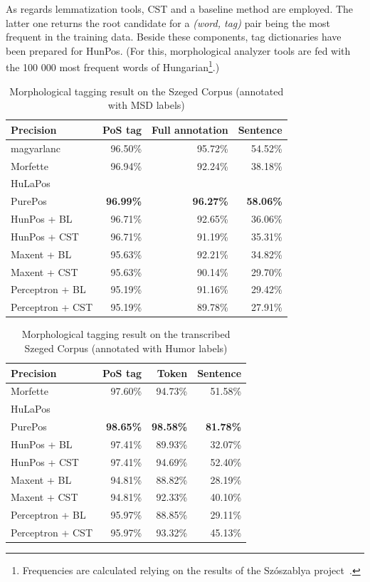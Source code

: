 As regards lemmatization tools, CST and a baseline method are employed. 
The latter one returns the root  candidate for a \emph{(word, tag) }pair being the most frequent in the training data. Beside these components, tag dictionaries have been prepared for HunPos. 
(For this, morphological analyzer tools are fed with the 100 000 most frequent words of Hungarian\footnote{Frequencies are calculated relying on the results of the Szószablya project~\cite{Halacsy2004}.}.) %

\begin{table}[ht]
 \centering
 \caption{Morphological tagging result on the Szeged Corpus (annotated with MSD labels)}
\begin{tabular}{l r r r}
  \hline
  \textbf{Precision} &  \textbf{PoS tag} &  \textbf{Full annotation} &  \textbf{Sentence} \\
  \hline
  magyarlanc &  96.50\% &  95.72\% &  54.52\% \\
  Morfette &  96.94\% &  92.24\% &  38.18\% \\
  HuLaPos &   &   &   \\
  PurePos &  \textbf{96.99\%} &  \textbf{96.27\%} &  \textbf{58.06\%} \\
  HunPos + BL &  96.71\% &  92.65\% &  36.06\% \\
  HunPos + CST &  96.71\% &  91.19\% &  35.31\% \\
  Maxent + BL &  95.63\% &  92.21\% &  34.82\% \\
  Maxent + CST &  95.63\% &  90.14\% &  29.70\% \\
  Perceptron + BL &  95.19\% &  91.16\% &  29.42\% \\
  Perceptron + CST &  95.19\% &  89.78\% &  27.91\% \\
  \hline
\end{tabular}
\label{tab:morphtag-orig}
\end{table}


\begin{table}[ht]
 \centering
 \caption{Morphological tagging result on the transcribed Szeged Corpus (annotated with Humor labels)}
\begin{tabular}{l r r r}
  \hline
  \textbf{Precision} &  \textbf{PoS tag} &  \textbf{Token} &  \textbf{Sentence} \\
  \hline
  Morfette &  97.60\% &  94.73\% &  51.58\% \\
  HuLaPos &   &   &   \\
  PurePos &  \textbf{98.65\%} &  \textbf{98.58\%} &  \textbf{81.78\%} \\
  HunPos + BL &  97.41\% &  89.93\% &  32.07\% \\
  HunPos + CST &  97.41\% &  94.69\% &  52.40\% \\
  Maxent + BL &  94.81\% &  88.82\% &  28.19\% \\
  Maxent + CST &  94.81\% &  92.33\% &  40.10\% \\
  Perceptron + BL &  95.97\% &  88.85\% &  29.11\% \\
  Perceptron + CST &  95.97\% &  93.32\% &  45.13\% \\
  \hline
\end{tabular}
\label{tab:morphtag-humor}
\end{table}


